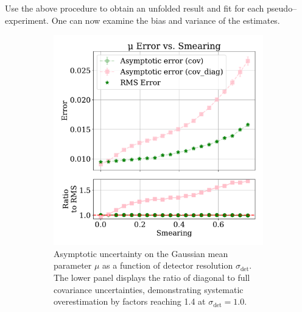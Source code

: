             Use the above procedure to obtain an unfolded result and fit for each pseudo--experiment.
            One can now examine the bias and variance of the estimates.
\begin{figure}
    \centering
    \begin{subfigure}[t]{0.48\textwidth}
        \centering
        \includegraphics[width=\textwidth]{figures/chapter-07/mu_error_plot_with_errorbars_ratio.pdf}
        \caption{Asymptotic uncertainty on the Gaussian mean parameter $\mu$ as a function of detector resolution $\sigma_{\text{det}}$.
        The lower panel displays the ratio of diagonal to full covariance uncertainties, demonstrating systematic overestimation by factors reaching 1.4 at $\sigma_{\text{det}} = 1.0$.}
        \label{fig:mu_error_plot_with_errorbars}
    \end{subfigure}
    \hfill
    \begin{subfigure}[t]{0.48\textwidth}
        \centering

\end{subfigure}
\end{figure}
